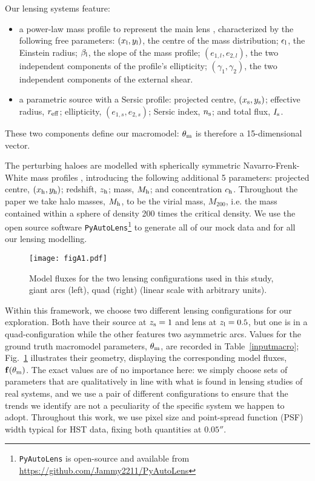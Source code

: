 \documentclass[a4paper, fleqn, usenatbib, useAMS]{mnras}
\def\tm{\theta_{\rm m}}
\begin{document}
Our lensing systems feature:
\begin{itemize}
\item{a power-law mass profile to represent the main lens \citep{Tessore2016}, characterized by the following free parameters: 
$(x_{\rm l}, y_{\rm l})$, the centre of the mass distribution;
$\epsilon_{\rm l}$,  the Einstein radius; $\beta_{\rm l}$,  
the slope of the mass profile; $(e_{1, l}, e_{2, l})$, the two
independent components of the profile's ellipticity;  
$(\gamma_1,\gamma_2)$, the two independent components of the external shear.}
\item{a parametric source with a Sersic profile: projected
    centre, $(x_{\rm s}, y_{\rm s})$; effective radius, $r_{\rm eff}$; 
ellipticity, $(e_{1,s}, e_{2, s})$; Sersic index, $n_{\rm s}$; and total flux, $I_{\rm s}$.}
\end{itemize}
These two components define our macromodel: $\tm$ is therefore a 15-dimensional vector.

The perturbing haloes are modelled with spherically symmetric
Navarro-Frenk-White mass profiles \citep{Navarro1997},  
introducing the following additional 5 parameters: projected centre,
$(x_{\rm h}, y_{\rm h})$; redshift, $z_{\rm h}$; mass,  $M_{\rm h}$; 
and concentration $c_{\rm h}$. Throughout the paper we take halo
masses, $M_{\rm h}$, to be the virial mass, $M_{200}$, i.e. the mass
contained within a sphere of density 200 times the critical density.
We use the open source software \texttt{PyAutoLens}\footnote{{\tt PyAutoLens} 
is open-source and available from \url{https://github.com/Jammy2211/PyAutoLens}} \citep{Nightingale2015, Nightingale2018, Nightingale2021} to generate all of our mock data and for all 
our lensing modelling. 

\begin{figure}
\centering
\texttt{[image: figA1.pdf]}
\caption{Model fluxes for the two lensing configurations used in this
  study, giant arcs (left), quad (right) (linear scale with arbitrary units).}
\label{macromodelsfig}
\end{figure}

Within this framework, we choose two different lensing configurations for our exploration. Both have their source
at $z_{\rm s} =1$ and lens at $z_{\rm l}=0.5$, but one is in a quad-configuration while the other features two asymmetric arcs. 
Values for the ground truth macromodel parameters, $\tm$, are recorded
in Table~\ref{inputmacro}; Fig.~\ref{macromodelsfig} illustrates their
geometry, displaying the corresponding model fluxes,
$\bf{f}(\tm)$. The exact values are of no importance here: we simply choose 
sets of parameters that are qualitatively in line with what is found in lensing studies of real systems, 
and we use a pair of different configurations to ensure that the trends we identify are not a peculiarity of the specific 
system we happen to adopt. Throughout this work, we use pixel size and point-spread function (PSF) width typical for HST data, 
fixing both quantities at $0.05''$.
\end{document}
